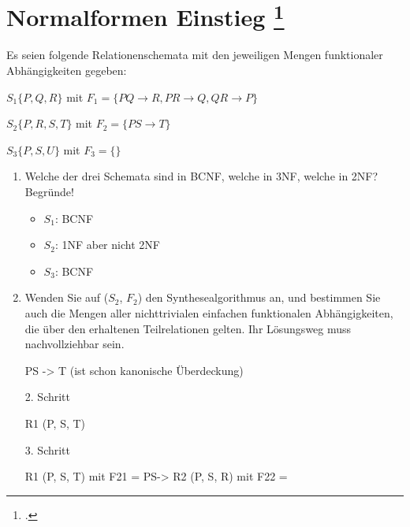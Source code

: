 \documentclass{lehramt-informatik-aufgabe}
\begin{document}

\section{Normalformen Einstieg
\footcite[Seite 1, Aufgabe 1: Normalformen Einstieg]{db:pu:4}
}

Es seien folgende Relationenschemata mit den jeweiligen Mengen
funktionaler Abhängigkeiten gegeben:

$S_1 \{P, Q, R\}$ mit
$F_1 = \{P Q \rightarrow R, P R \rightarrow Q, QR \rightarrow P \}$

$S_2 \{P, R, S, T \}$ mit
$F_2 = \{P S \rightarrow T \}$

$S_3 \{P, S, U \}$ mit
$F_3 = \{\}$

\begin{enumerate}


\item Welche der drei Schemata sind in
BCNF, welche in 3NF, welche in 2NF? Begründe!

\begin{liAntwort}
\begin{itemize}
\item $S_1$: BCNF

\item $S_2$: 1NF aber nicht 2NF

\item $S_3$: BCNF
\end{itemize}
\end{liAntwort}


\item Wenden Sie auf ($S_2$, $F_2$) den
Synthesealgorithmus an, und bestimmen Sie
auch die Mengen aller nichttrivialen einfachen funktionalen
Abhängigkeiten, die über den erhaltenen Teilrelationen gelten. Ihr
Lösungsweg muss nachvollziehbar sein.

\begin{liAntwort}
PS -> T (ist schon kanonische Überdeckung)

2. Schritt

R1 (P, S, T)

3. Schritt

R1 (P, S, T) mit F21 = {PS->}
R2 (P, S, R) mit F22 = {}

\end{liAntwort}

\end{enumerate}
\end{document}
